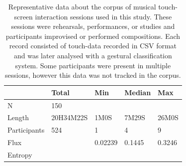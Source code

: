 \documentclass{sigchi}
\begin{document}


\begin{table}
\centering
\begin{tabular}{l|llll}
\hline
            & Total & Min  & Median   & Max     \\ 
\hline
N           & 150       &         &        &  \\
Length      & 20H34M22S & 1M0S    & 7M29S  & 26M0S\\
Participants& 524       & 1       & 4      & 9    \\
Flux        &           & 0.02239 & 0.1445 & 0.3246\\
Entropy     &           &  &  & \\          
\hline
\end{tabular}
\caption{
  Representative data about the corpus of musical touch-screen
  interaction sessions used in this study. These sessions were
  rehearsals, performances, or studies and 
  participants improvised or performed compositions. Each record
  consisted of touch-data recorded in CSV format and was later analysed
  with a gestural classification system. Some participants were
  present in multiple sessions, however this data was not tracked in
  the corpus.\label{corpus-table}}
\end{table}
\end{document}

